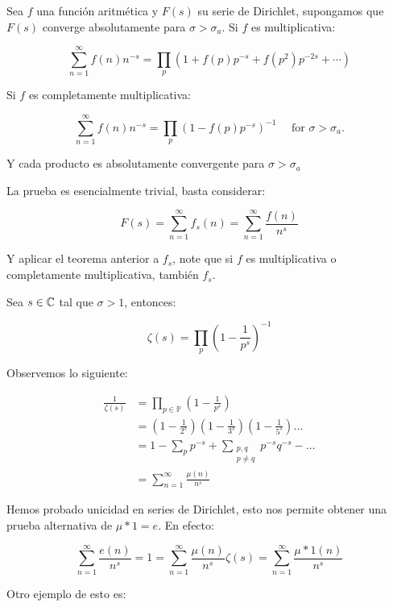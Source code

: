 \begin{corollary}
Sea $f$ una función aritmética y $F(s)$ su serie de Dirichlet, supongamos que $F(s)$ converge absolutamente para $\sigma>\sigma_a$. Si $f$ es  multiplicativa:

$$
\sum_{n=1}^{\infty} f(n) n^{-s}=\prod_p\left(1+f(p) p^{-s}+f\left(p^2\right) p^{-2 s}+\cdots\right)
$$

Si $f$ es completamente multiplicativa:

$$
\sum_{n=1}^{\infty} f(n) n^{-s}=\prod_p\left(1-f(p) p^{-s}\right)^{-1} \quad \text { for } \sigma>\sigma_a .
$$

Y cada producto es absolutamente convergente para $\sigma>\sigma_a$
\end{corollary}

La prueba es esencialmente trivial, basta considerar:

$$F(s)=\sum_{n=1}^{\infty} f_s(n)=\sum_{n=1}^{\infty} \frac{f(n)}{n^s}$$

Y aplicar el teorema anterior a $f_s$, note que si $f$ es multiplicativa o completamente multiplicativa, también $f_s$.

\begin{corollary}
Sea $s\in \mathbb{C}$ tal que $\sigma>1$, entonces:

$$\zeta(s)=\prod_{p}\left(1-\frac{1}{p^s}\right)^{-1} $$
\end{corollary}

Observemos lo siguiente:

$$\begin{aligned}
\frac{1}{\zeta(s)} & =\prod_{p \in \mathbb{P}}\left(1-\frac{1}{p^s}\right) \\
& =\left(1-\frac{1}{2^s}\right)\left(1-\frac{1}{3^s}\right)\left(1-\frac{1}{5^s}\right) \ldots \\
& =1-\sum_{p} p^{-s}+\sum_{\substack{p, q\\p\neq q}} p^{-s} q^{-s}-\ldots \\
& =\sum_{n=1}^{\infty} \frac{\mu(n)}{n^s}
\end{aligned}$$

Hemos probado unicidad en series de Dirichlet, esto nos permite obtener una prueba alternativa de $\mu*1=e$. En efecto:

$$\sum_{n=1}^{\infty} \frac{e(n)}{n^s}=1=\sum_{n=1}^{\infty} \frac{\mu(n)}{n^s}\zeta(s)=\sum_{n=1}^{\infty} \frac{\mu*1(n)}{n^s}$$

Otro ejemplo de  esto es:

